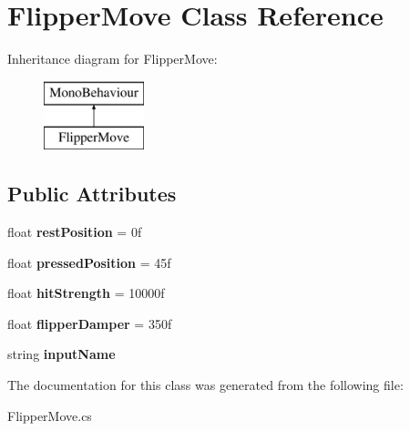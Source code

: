 \hypertarget{class_flipper_move}{}\section{Flipper\+Move Class Reference}
\label{class_flipper_move}
Inheritance diagram for Flipper\+Move\+:\begin{figure}[H]
\begin{center}
\leavevmode
\includegraphics[height=2.000000cm]{class_flipper_move}
\end{center}
\end{figure}
\subsection*{Public Attributes}
\begin{DoxyCompactItemize}
\item 
\mbox{\label{class_flipper_move_aa4b8166810663327c8d058822d626387}} 
float {\bfseries rest\+Position} = 0f
\item 
\mbox{\label{class_flipper_move_a8b35bce53e12f147a1908986f6ffe73f}} 
float {\bfseries pressed\+Position} = 45f
\item 
\mbox{\label{class_flipper_move_a64c20e1451ba300c8d5c9a039b6568b9}} 
float {\bfseries hit\+Strength} = 10000f
\item 
\mbox{\label{class_flipper_move_a76180542cb57330e4c87225b3e01f50f}} 
float {\bfseries flipper\+Damper} = 350f
\item 
\mbox{\label{class_flipper_move_a5e3209a830a3bba9f86c3563ed6d2cda}} 
string {\bfseries input\+Name}
\end{DoxyCompactItemize}


The documentation for this class was generated from the following file\+:\begin{DoxyCompactItemize}
\item 
Flipper\+Move.\+cs\end{DoxyCompactItemize}
